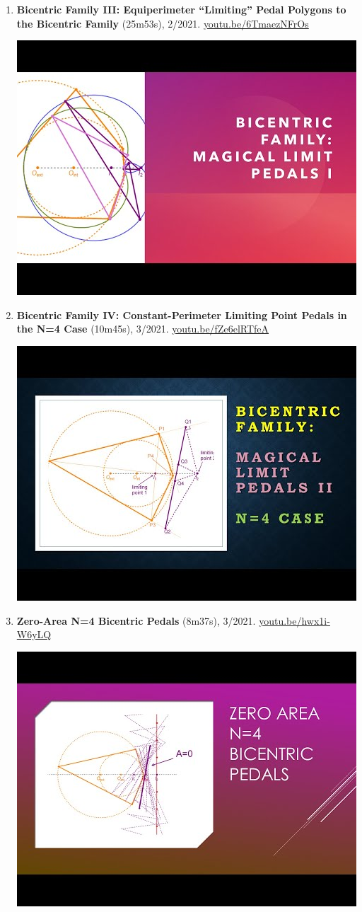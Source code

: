 \documentclass[12pt]{article}
\begin{document}
\begin{enumerate}[resume]
% 
\item \textbf{Bicentric Family III: Equiperimeter ``Limiting'' Pedal Polygons to the Bicentric Family} (25m53s), 2/2021. \href{https://youtu.be/6TmaezNFrOs}{\url{youtu.be/6TmaezNFrOs}}
\begin{center}\includegraphics[width=.5\textwidth]{pics/6TmaezNFrOs.jpg}\end{center}
% 
\item \textbf{Bicentric Family IV: Constant-Perimeter Limiting Point Pedals in the N=4 Case} (10m45s), 3/2021. \href{https://youtu.be/fZe6elRTfeA}{\url{youtu.be/fZe6elRTfeA}}
\begin{center}\includegraphics[width=.5\textwidth]{pics/fZe6elRTfeA.jpg}\end{center}
% 
\item \textbf{Zero-Area N=4 Bicentric Pedals} (8m37s), 3/2021. \href{https://youtu.be/hwx1i-W6yLQ}{\url{youtu.be/hwx1i-W6yLQ}}
\begin{center}\includegraphics[width=.5\textwidth]{pics/hwx1i-W6yLQ.jpg}\end{center}

\end{enumerate}
\end{document}
